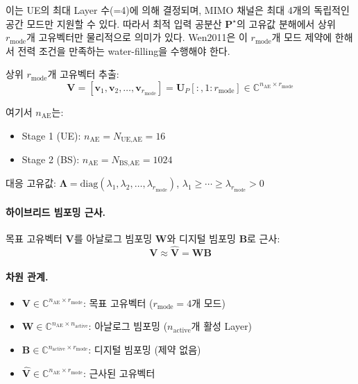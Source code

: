 \documentclass[10pt]{article}
\begin{document}
이는 UE의 최대 Layer 수(=4)에 의해 결정되며, MIMO 채널은 최대 4개의 독립적인 공간 모드만 지원할 수 있다. 따라서 최적 입력 공분산 $\mathbf{P}^{\star}$의 고유값 분해에서 상위 $r_{\text{mode}}$개 고유벡터만 물리적으로 의미가 있다. Wen2011은 이 $r_{\text{mode}}$개 모드 제약에 한해서 전력 조건을 만족하는 water-filling을 수행해야 한다.

상위 $r_{\text{mode}}$개 고유벡터 추출:
\begin{equation}
\mathbf{V} = [\mathbf{v}_1, \mathbf{v}_2, \ldots, \mathbf{v}_{r_{\text{mode}}}] = \mathbf{U}_{P}[:, 1:r_{\text{mode}}] \in \mathbb{C}^{n_{\text{AE}} \times r_{\text{mode}}}
\end{equation}

여기서 $n_{\text{AE}}$는:
\begin{itemize}
    \item Stage 1 (UE): $n_{\text{AE}} = N_{\text{UE,AE}} = 16$
    \item Stage 2 (BS): $n_{\text{AE}} = N_{\text{BS,AE}} = 1024$
\end{itemize}

대응 고유값: $\boldsymbol{\Lambda} = \text{diag}(\lambda_1, \lambda_2, \ldots, \lambda_{r_{\text{mode}}})$, $\lambda_1 \geq \cdots \geq \lambda_{r_{\text{mode}}} > 0$

\paragraph{하이브리드 빔포밍 근사.}
목표 고유벡터 $\mathbf{V}$를 아날로그 빔포밍 $\mathbf{W}$와 디지털 빔포밍 $\mathbf{B}$로 근사:
\begin{equation}
\mathbf{V} \approx \hat{\mathbf{V}} = \mathbf{W} \mathbf{B}
\end{equation}

\paragraph{차원 관계.}
\begin{itemize}
    \item $\mathbf{V} \in \mathbb{C}^{n_{\text{AE}} \times r_{\text{mode}}}$: 목표 고유벡터 ($r_{\text{mode}}=4$개 모드)
    \item $\mathbf{W} \in \mathbb{C}^{n_{\text{AE}} \times n_{\text{active}}}$: 아날로그 빔포밍 ($n_{\text{active}}$개 활성 Layer)
    \item $\mathbf{B} \in \mathbb{C}^{n_{\text{active}} \times r_{\text{mode}}}$: 디지털 빔포밍 (제약 없음)
    \item $\hat{\mathbf{V}} \in \mathbb{C}^{n_{\text{AE}} \times r_{\text{mode}}}$: 근사된 고유벡터
\end{itemize}
\end{document}

